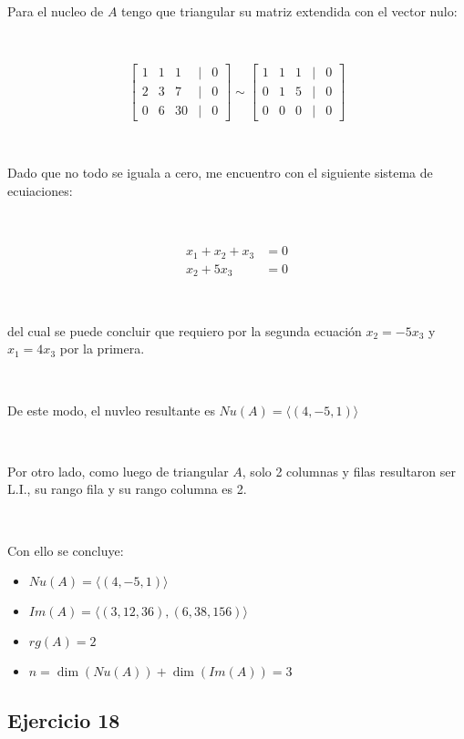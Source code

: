 \documentclass{article}
\begin{document}
\

\noindent Para el nucleo de $A$ tengo que triangular su matriz extendida con el vector nulo:

\

\[
\begin{bmatrix}
    1 & 1 & 1 & | & 0 \\
    2 & 3 & 7 & | & 0 \\
    0 & 6 & 30 & | & 0 
\end{bmatrix}
\sim
\begin{bmatrix}
    1 & 1 & 1 & | & 0 \\
    0 & 1 & 5 & | & 0 \\
    0 & 0 & 0 & | & 0
\end{bmatrix}
\]

\

\noindent Dado que no todo se iguala a cero, me encuentro con el siguiente sistema de ecuiaciones:

\

\begin{align*}
    x_1 + x_2 + x_3 &= 0 \\
    x_2 + 5x_3 &= 0
\end{align*}

\

del cual se puede concluir que requiero por la segunda ecuación $x_2 = -5x_3$ y $x_1 = 4x_3$ por la primera.

\

\noindent De este modo, el nuvleo resultante es $Nu(A) = \langle (4,-5,1) \rangle$

\

\noindent Por otro lado, como luego de triangular $A$, solo 2 columnas y filas resultaron ser L.I.,
su rango fila y su rango columna es 2.

\

Con ello se concluye:

\begin{itemize}
    \item $Nu(A) = \langle (4,-5,1) \rangle$ 
    \item $Im(A) = \langle (3,12,36), (6, 38, 156) \rangle$
    \item $rg(A) = 2$
    \item $n = \dim(Nu(A)) + \dim(Im(A)) = 3$  
\end{itemize}

\newpage

\subsection*{Ejercicio 18}
\end{document}
